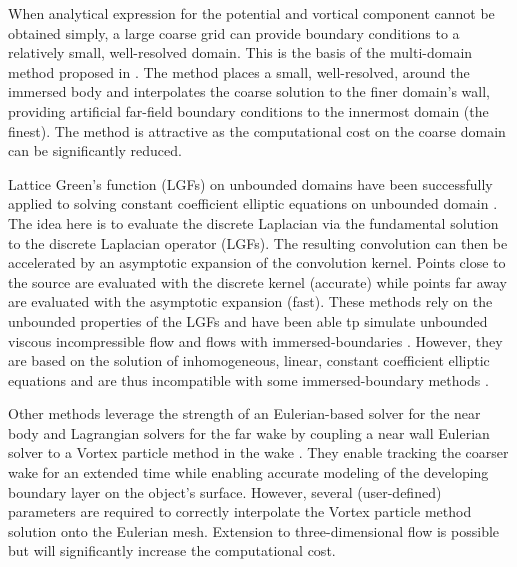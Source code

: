 \documentclass[preprint,12pt]{elsarticle}
\begin{document}

When analytical expression for the potential and vortical component cannot be obtained simply, a large coarse grid can provide boundary conditions to a relatively small, well-resolved domain. This is the basis of the multi-domain method proposed in \cite{Colonius2008}. The method places a small, well-resolved, around the immersed body and interpolates the coarse solution to the finer domain's wall, providing artificial far-field boundary conditions to the innermost domain (the finest). The method is attractive as the computational cost on the coarse domain can be significantly reduced.

Lattice Green's function (LGFs) on unbounded domains have been successfully applied to solving constant coefficient elliptic equations on unbounded domain \cite{Liska2014AEquations}. The idea here is to evaluate the discrete Laplacian via the fundamental solution to the discrete Laplacian operator (LGFs). The resulting convolution can then be accelerated by an asymptotic expansion of the convolution kernel. Points close to the source are evaluated with the discrete kernel (accurate) while points far away are evaluated with the asymptotic expansion (fast). These methods rely on the unbounded properties of the LGFs and have been able tp simulate unbounded viscous incompressible flow \cite{Liska2016ADomains} and flows with immersed-boundaries \cite{Liska2017AFunctions}. However, they are based on the solution of inhomogeneous, linear, constant coefficient elliptic equations and are thus incompatible with some immersed-boundary methods \cite{Maertens2015}.



Other methods leverage the strength of an Eulerian-based solver for the near body and Lagrangian solvers for the far wake by coupling a near wall Eulerian solver to a Vortex particle method in the wake \cite{Billuart2023AFlows}. They enable tracking the coarser wake for an extended time while enabling accurate modeling of the developing boundary layer on the object's surface. However, several (user-defined) parameters are required to correctly interpolate the Vortex particle method solution onto the Eulerian mesh. Extension to three-dimensional flow is possible but will significantly increase the computational cost.
\end{document}
